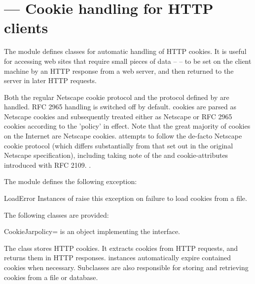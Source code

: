 \section{ ---
         Cookie handling for HTTP clients}




The  module defines classes for automatic handling
of HTTP cookies.  It is useful for accessing web sites that require
small pieces of data --  -- to be set on the client
machine by an HTTP response from a web server, and then returned to
the server in later HTTP requests.

Both the regular Netscape cookie protocol and the protocol defined by
 are handled.  RFC 2965 handling is switched off by default.
 cookies are parsed as Netscape cookies and subsequently
treated either as Netscape or RFC 2965 cookies according to the
'policy' in effect.  Note that the great majority of cookies on the
Internet are Netscape cookies.   attempts to follow
the de-facto Netscape cookie protocol (which differs substantially
from that set out in the original Netscape specification), including
taking note of the  and  cookie-attributes
introduced with RFC 2109.  .


The module defines the following exception:

\begin{excdesc}{LoadError}
Instances of  raise this exception on failure to
load cookies from a file.
\end{excdesc}


The following classes are provided:

\begin{classdesc}{CookieJar}{policy=}
 is an object implementing the 
interface.

The  class stores HTTP cookies.  It extracts cookies
from HTTP requests, and returns them in HTTP responses.
 instances automatically expire contained cookies
when necessary.  Subclasses are also responsible for storing and
retrieving cookies from a file or database.
\end{classdesc}

